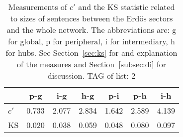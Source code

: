 \begin{table}[h!]
\begin{center}
\caption{Measurements of $c'$ and the KS statistic related to sizes of sentences between the Erd\"os sectors and the whole network. The abbreviations are: g for global, p for peripheral, i for intermediary, h for hubs. See Section~\ref{sec:ks} for and explanation of the measures and Section~\ref{subsec:di} for discussion. TAG of list: 2}
\begin{tabular}{l | c c c c c c}
{\bf } & {\bf p-g} & {\bf i-g} & {\bf h-g} & {\bf p-i} & {\bf p-h} & {\bf i-h} \\\hline
$c'$ & 0.733  & 2.077  & 2.834  & 1.642  & 2.589  & 4.139 \\
KS & 0.020  & 0.038  & 0.059  & 0.048  & 0.080  & 0.097 \\
\end{tabular}
\end{center}
\end{table}
